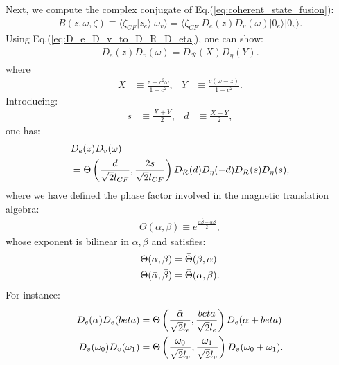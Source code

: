 \begin{subappendices}
Next, we compute the complex conjugate of Eq.(\ref{eq:coherent_state_fusion}):
\begin{align}
B(z,\omega,\zeta)\equiv\langle\zeta_{CF}|z_e\rangle|\omega_v\rangle=\langle\zeta_{CF}|D_{e}(z) D_{v}(\omega)|0_e\rangle|0_v\rangle.\label{eq:B_definition}
\end{align}
Using Eq.(\ref{eq:D_e_D_v_to_D_R_D_eta}), one can show:
\begin{align}
D_{e}(z) D_{v}(\omega)=D_{\mathcal R}(X)D_\eta(Y).
\end{align}
where
\begin{align}
X&\equiv\frac{z-c^2\omega}{1-c^2}, &Y&\equiv\frac{c(\omega-z)}{1-c^2}.
\end{align}
Introducing:
\begin{align}
s&\equiv\frac{X+Y}{2},& d&\equiv\frac{X-Y}{2},
\end{align}
one has:
\begin{align}
&D_{e}(z) D_{v}(\omega)\notag\\
&=\Theta\left(\frac{d}{\sqrt{2}l_{CF}},\frac{2s}{\sqrt{2}l_{CF}}\right) D_{\mathcal R}(d)D_{\eta}(-d)D_{\mathcal R}(s)D_{\eta}(s),\label{eq:D_e_D_v}
\end{align}
where we have defined the phase factor involved in the magnetic translation algebra:
\begin{align}
\Theta(\alpha,\beta)\equiv e^{\frac{\alpha\bar\beta-\bar\alpha\beta}{2}},
\end{align}
whose exponent is bilinear in $\alpha,\beta$ and satisfies:
\begin{align}
\Theta(\alpha,\beta)&=\bar \Theta(\beta,\alpha)\notag\\
\Theta(\bar \alpha,\bar\beta)&=\bar \Theta(\alpha,\beta).
\end{align}
For instance:
\begin{align}
D_e(\alpha)D_e(beta)&=\Theta\left(\frac{\bar \alpha}{\sqrt 2l_e},\frac{\bar beta}{\sqrt 2l_e}\right)D_e(\alpha+beta)\notag\\
D_v(\omega_0)D_v(\omega_1)&=\Theta\left(\frac{\omega_0}{\sqrt 2l_v},\frac{\omega_1}{\sqrt 2l_v}\right)D_v(\omega_0+\omega_1).
\end{align}


\end{subappendices}
